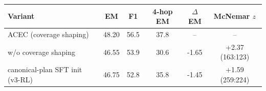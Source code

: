 \begin{tabular}{lccccc}
\toprule
Variant & EM & F1 & 4-hop EM & $\Delta$EM & McNemar $z$ \\
\midrule
ACEC (coverage shaping) & 48.20 & 56.5 & 37.8 & -- & -- \\
\;\;w/o coverage shaping & 46.55 & 53.9 & 30.6 & -1.65 & +2.37 (163:123) \\
\;\;canonical-plan SFT init (v3-RL) & 46.75 & 52.8 & 35.8 & -1.45 & +1.59 (259:224) \\
\bottomrule
\end{tabular}
